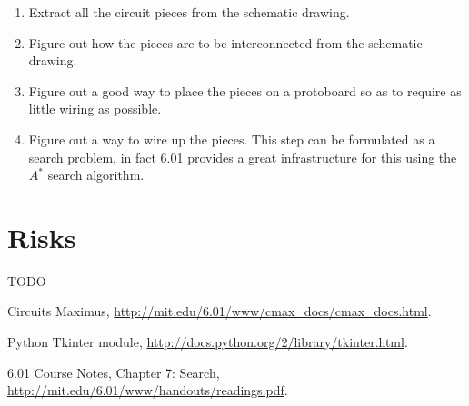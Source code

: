 \documentclass[12pt, doublespacing]{amsart}
\begin{document}
\begin{enumerate}
\item Extract all the circuit pieces from the schematic drawing.
\item Figure out how the pieces are to be interconnected from the schematic drawing.
\item Figure out a good way to place the pieces on a protoboard so as to require as little wiring as possible.
\item Figure out a way to wire up the pieces. This step can be formulated as a search problem, in fact 6.01 provides a great infrastructure for this using the $A^*$ search algorithm\cite{6.01search}.
\end{enumerate}

\section{Risks}
\label{sec:risks}
TODO

\begin{thebibliography}{9}

Circuits Maximus,
\url{http://mit.edu/6.01/www/cmax_docs/cmax_docs.html}.

Python Tkinter module, \url{http://docs.python.org/2/library/tkinter.html}.

6.01 Course Notes, Chapter 7: Search, \url{http://mit.edu/6.01/www/handouts/readings.pdf}.

\end{thebibliography}
\end{document}
